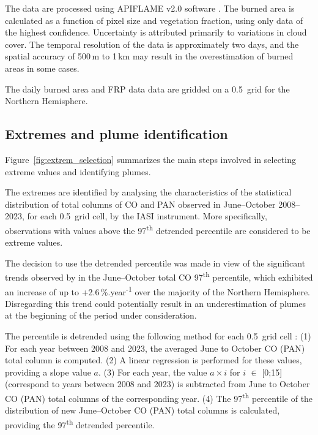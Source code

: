 \documentclass[acp, manuscript]{copernicus}
\begin{document}
The data are processed using APIFLAME v2.0 software \citep{turquetyAPIFLAMEV20Biomass2020}. The burned area is calculated as a function of pixel size and vegetation fraction, using only data of the highest confidence. Uncertainty is attributed primarily to variations in cloud cover. The temporal resolution of the data is approximately two days, and the spatial accuracy of 500\,m to 1\,km may result in the overestimation of burned areas in some cases. %

The daily burned area and FRP data data are gridded on a 0.5\textdegree {}\textdegree\ grid for the Northern Hemisphere.



\subsection{Extremes and plume identification}\label{method_extremes_chap4}

Figure~\ref{fig:extrem_selection} summarizes the main steps involved in selecting extreme values and identifying plumes.  

The extremes are identified by analysing the characteristics of the statistical distribution of total columns of CO and PAN observed in June--October 2008--2023, for each 0.5\textdegree {}\textdegree\ grid cell, by the IASI instrument. More specifically, observations with values above the 97\textsuperscript{th} detrended percentile are considered to be extreme values. 


The decision to use the detrended percentile was made in view of the significant trends observed by \citet{ehretIncreaseCarbonMonoxide2025} in the June--October total CO 97\textsuperscript{th} percentile, which exhibited an increase of up to +2.6\,\%.year\textsuperscript{-1} over the majority of the Northern Hemisphere. Disregarding this trend could potentially result in an underestimation of plumes at the beginning of the period under consideration.


The percentile is detrended using the following method for each 0.5\textdegree {}\textdegree\ grid cell : (1) For each year between 2008 and 2023, the averaged June to October CO (PAN) total column is computed. (2) A linear regression is performed for these values, providing a slope value $a$. (3) For each year, the value $a\times i$ for $i$ $\in$ {[0;15]} (correspond to years between 2008 and 2023) is subtracted from June to October CO (PAN) total columns of the corresponding year. (4) The 97\textsuperscript{th} percentile of the distribution of new June--October CO (PAN) total columns is calculated, providing the 97\textsuperscript{th} detrended percentile. 
\end{document}

